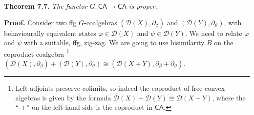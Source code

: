 \par\medskip
\hypertarget{html:S7.Thmtheorem7}{} \par\noindent\textbf{\textbf{Theorem 7.7}\textbf{.}}\quad  %
\hypertarget{html:S7.Thmtheorem7.p1}{} \emph{The functor %
\hypertarget{html:S7.Thmtheorem7.p1.m1}{}\({G:\mathsf{CA}\to\mathsf{CA}}\) is proper.}
\par\medskip
\hypertarget{html:S7.SS0.SSS0.P0.SPx4}{} \par\noindent\textbf{Proof.}\quad  %
\hypertarget{html:S7.SS0.SSS0.P0.SPx4.p1}{} Consider two ffg %
\hypertarget{html:S7.SS0.SSS0.P0.SPx4.p1.m1}{}\({G}\)-coalgebras %
\hypertarget{html:S7.SS0.SSS0.P0.SPx4.p1.m2}{}\({({\mathcal{D}}(X),\partial_{\beta})}\) and %
\hypertarget{html:S7.SS0.SSS0.P0.SPx4.p1.m3}{}\({({\mathcal{D}}(Y),\partial_{\vartheta})}\), with behaviourally equivalent states %
\hypertarget{html:S7.SS0.SSS0.P0.SPx4.p1.m4}{}\({\varphi\in{\mathcal{D}}(X)}\) and %
\hypertarget{html:S7.SS0.SSS0.P0.SPx4.p1.m5}{}\({\psi\in{\mathcal{D}}(Y)}\). We need to relate %
\hypertarget{html:S7.SS0.SSS0.P0.SPx4.p1.m6}{}\({\varphi}\) and %
\hypertarget{html:S7.SS0.SSS0.P0.SPx4.p1.m7}{}\({\psi}\) with a suitable, ffg, zig-zag. We are going to use bisimilarity %
\hypertarget{html:S7.SS0.SSS0.P0.SPx4.p1.m8}{}\({B}\) on the coproduct coalgebra%
\hypertarget{html:footnote2}{}\footnote{Left adjoints preserve colimits, so indeed the coproduct of free convex algebras is given by the formula %
\hypertarget{html:footnote2.m1}{}\({{\mathcal{D}}(X)+{\mathcal{D}}(Y)\cong{\mathcal{D}}(X+Y)}\), where the “%
\hypertarget{html:footnote2.m2}{}\({+}\)” on the left hand side is the coproduct in %
\hypertarget{html:footnote2.m3}{}\({\mathsf{CA}}\).} %
\hypertarget{html:S7.SS0.SSS0.P0.SPx4.p1.m9}{}\({({\mathcal{D}}(X),\partial_{\beta})+({\mathcal{D}}(Y),\partial_{\vartheta})\cong({\mathcal{D}}(X+Y),\partial_{\beta}+\partial_{\vartheta})}\).
\par\medskip

